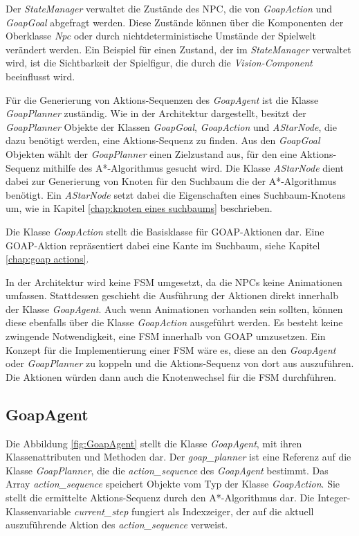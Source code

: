 Der \textit{StateManager} verwaltet die Zustände des NPC, die von \textit{GoapAction} und \textit{GoapGoal} abgefragt werden. Diese Zustände können über die Komponenten der Oberklasse \textit{Npc} oder durch nichtdeterministische Umstände der Spielwelt verändert werden. Ein Beispiel für einen Zustand, der im \textit{StateManager} verwaltet wird, ist die Sichtbarkeit der Spielfigur, die durch die \textit{Vision-Component} beeinflusst wird.

Für die Generierung von Aktions-Sequenzen des \textit{GoapAgent} ist die Klasse \textit{GoapPlanner} zuständig. Wie in der Architektur dargestellt, besitzt der \textit{GoapPlanner} Objekte der Klassen \textit{GoapGoal}, \textit{GoapAction} und \textit{AStarNode}, die dazu benötigt werden, eine Aktions-Sequenz zu finden. Aus den \textit{GoapGoal} Objekten wählt der \textit{GoapPlanner} einen Zielzustand aus, für den eine Aktions-Sequenz mithilfe des A*-Algorithmus gesucht wird. Die Klasse \textit{AStarNode} dient dabei zur Generierung von Knoten für den Suchbaum die der A*-Algorithmus benötigt. Ein \textit{AStarNode} setzt dabei die Eigenschaften eines Suchbaum-Knotens um, wie in Kapitel \ref{chap:knoten eines suchbaums} beschrieben.

Die Klasse \textit{GoapAction} stellt die Basisklasse für GOAP-Aktionen dar. Eine GOAP-Aktion repräsentiert dabei eine Kante im Suchbaum, siehe Kapitel \ref{chap:goap actions}.

In der Architektur wird keine FSM umgesetzt, da die NPCs keine Animationen umfassen. Stattdessen geschieht die Ausführung der Aktionen direkt innerhalb der Klasse \textit{GoapAgent}. Auch wenn Animationen vorhanden sein sollten, können diese ebenfalls über die Klasse \textit{GoapAction} ausgeführt werden. Es besteht keine zwingende Notwendigkeit, eine FSM innerhalb von GOAP umzusetzen. Ein Konzept für die Implementierung einer FSM wäre es, diese an den \textit{GoapAgent} oder \textit{GoapPlanner} zu koppeln und die Aktions-Sequenz von dort aus auszuführen. Die Aktionen würden dann auch die Knotenwechsel für die FSM durchführen.








\subsection{GoapAgent}
\label{chap:goapagent uml}

Die Abbildung \ref{fig:GoapAgent} stellt die Klasse \textit{GoapAgent}, mit ihren Klassenattributen und Methoden dar. Der \textit{goap\_planner} ist eine Referenz auf die Klasse \textit{GoapPlanner}, die die \textit{action\_sequence} des \textit{GoapAgent} bestimmt. Das Array \textit{action\_sequence} speichert Objekte vom Typ der Klasse \textit{GoapAction}. Sie stellt die ermittelte Aktions-Sequenz durch den A*-Algorithmus dar. Die Integer-Klassenvariable \textit{current\_step} fungiert als Indexzeiger, der auf die aktuell auszuführende Aktion des \textit{action\_sequence} verweist.

